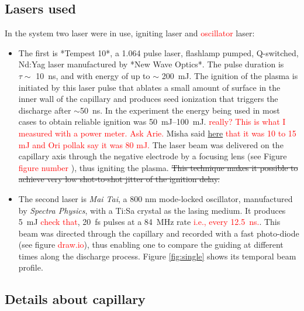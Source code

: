 \documentclass[nofonts]{tufte-book}
\begin{document}
		\subsection{Lasers used}\label{ssec:lasers}
In the system two laser were in use, igniting laser and \textcolor{red}{oscillator} laser:
\begin{itemize}
    	\item The first is *Tempest 10*, a \SI{1.064}{\mu} pulse laser, flashlamp pumped, Q-switched, Nd:Yag laser manufactured by *New Wave Optics*. The pulse duration is $\tau \sim$ \SI{10}{\ns}, and with energy of up to $\sim$ \SI{200}{\mJ}. The ignition of the plasma is initiated by this laser pulse that ablates a small amount of surface in the inner wall of the capillary and produces seed ionization that triggers the discharge after $\sim$\SI{50}{\ns}. In the experiment the energy being used in most cases to obtain reliable ignition was \SIrange{50}{100}{\mJ}. \textcolor{red}{really? This is what I measured with a power meter. Ask Arie.} Misha said \href{https://aip.scitation.org/doi/full/10.1063/1.2149183}{here} \textcolor{red}{that it was 10 to 15 mJ and Ori pollak say it was 80 mJ.} The laser beam was delivered on the capillary axis through the negative electrode by a focusing lens (see Figure \textcolor{red}{figure number }), thus igniting the plasma. \st{This technique makes it possible to achieve very low shot-to-shot jitter of the ignition delay.}
	\item The second laser is \textit{Mai Tai}, a 800 nm mode-locked oscillator, manufactured by \textit{Spectra Physics}, with a Ti:Sa crystal as the lasing medium. It produces \SI{5}{\mJ} \textcolor{red}{check that}, \SI{20}{\fs} pulses at a \SI{84}{\MHz} rate \textcolor{red}{i.e., every \SI{12.5}{\ns}.}. This beam was directed through the capillary and recorded with a fast photo-diode (see figure \textcolor{red}{draw.io}), thus enabling one to compare the guiding at different times along the discharge process. Figure \ref{fig:single} shows its temporal beam profile.
\end{itemize}
	\subsection{Details about capillary}
\end{document}
